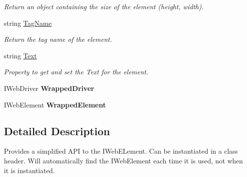 \begin{DoxyCompactItemize}
\begin{DoxyCompactList}\small\item\em Return an object containing the size of the element (height, width). \end{DoxyCompactList}\item 
string \hyperlink{class_proto_test_1_1_golem_1_1_web_driver_1_1_element_a9a7f8583131d5e0a97e8280e56617360}{Tag\-Name}
\begin{DoxyCompactList}\small\item\em Return the tag name of the element. \end{DoxyCompactList}\item 
string \hyperlink{class_proto_test_1_1_golem_1_1_web_driver_1_1_element_af3b6f6f3e2afdd7d5e08c25dd516220f}{Text}
\begin{DoxyCompactList}\small\item\em Property to get and set the Text for the element. \end{DoxyCompactList}\item 
\hypertarget{class_proto_test_1_1_golem_1_1_web_driver_1_1_element_a4b86d1587d9df06cbd1bd39c08b8e592}{I\-Web\-Driver {\bfseries Wrapped\-Driver}}\label{class_proto_test_1_1_golem_1_1_web_driver_1_1_element_a4b86d1587d9df06cbd1bd39c08b8e592}

\item 
\hypertarget{class_proto_test_1_1_golem_1_1_web_driver_1_1_element_a45f5f1bc2f5ab643a4ab15b0d8831a2f}{I\-Web\-Element {\bfseries Wrapped\-Element}}\label{class_proto_test_1_1_golem_1_1_web_driver_1_1_element_a45f5f1bc2f5ab643a4ab15b0d8831a2f}

\end{DoxyCompactItemize}


\subsection{Detailed Description}
Provides a simplified A\-P\-I to the I\-Web\-E\-Lement. Can be instantiated in a class header. Will automatically find the I\-Web\-Element each time it is used, not when it is instantiated. 



